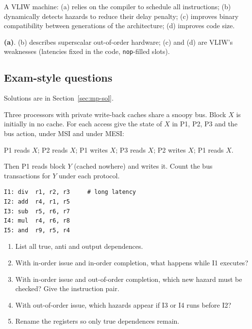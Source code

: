 \begin{exercise}[Lecturer 6]
A VLIW machine: (a) relies on the compiler to schedule all instructions;
(b) dynamically detects hazards to reduce their delay penalty; (c) improves binary
compatibility between generations of the architecture; (d) improves code size.
\end{exercise}
\begin{solution}
\textbf{(a)}. (b) describes superscalar out-of-order hardware; (c) and (d) are VLIW's
weaknesses (latencies fixed in the code, \texttt{nop}-filled slots).
\end{solution}

\subsection{Exam-style questions}
Solutions are in Section~\ref{sec:mp-sol}.

\begin{exercise}\label{q:mp-mesi}
Three processors with private write-back caches share a snoopy bus. Block $X$ is
initially in no cache. For each access give the state of $X$ in P1, P2, P3 and the bus
action, under MSI and under MESI:
\begin{center}
P1 reads $X$; P2 reads $X$; P1 writes $X$; P3 reads $X$; P2 writes $X$; P1 reads $X$.
\end{center}
Then P1 reads block $Y$ (cached nowhere) and writes it. Count the bus transactions for
$Y$ under each protocol.
\end{exercise}

\begin{exercise}\label{q:mp-dep}
\leavevmode
\begin{lstlisting}
I1: div  r1, r2, r3     # long latency
I2: add  r4, r1, r5
I3: sub  r5, r6, r7
I4: mul  r4, r6, r8
I5: and  r9, r5, r4
\end{lstlisting}
\begin{enumerate}[label=(\alph*),leftmargin=*]
  \item List all true, anti and output dependences.
  \item With in-order issue and in-order completion, what happens while I1 executes?
  \item With in-order issue and out-of-order completion, which new hazard must be
  checked? Give the instruction pair.
  \item With out-of-order issue, which hazards appear if I3 or I4 runs before I2?
  \item Rename the registers so only true dependences remain.
\end{enumerate}
\end{exercise}

